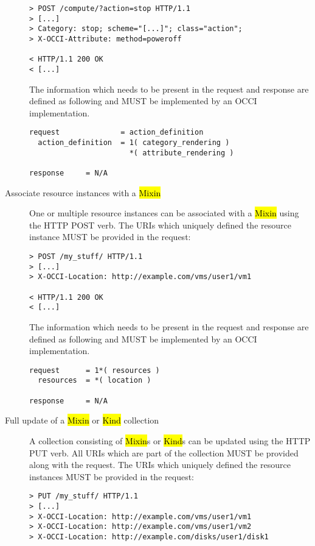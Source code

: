 \documentclass[10pt,a4paper]{article}
\begin{document}
\begin{description}
\begin{verbatim}
> POST /compute/?action=stop HTTP/1.1
> [...]
> Category: stop; scheme="[...]"; class="action";
> X-OCCI-Attribute: method=poweroff

< HTTP/1.1 200 OK
< [...]
\end{verbatim}

    The information which needs to be present in the request and
    response are defined as following and MUST be implemented by an
    OCCI implementation.

\begin{verbatim}
request              = action_definition
  action_definition  = 1( category_rendering )
                       *( attribute_rendering )

response     = N/A
\end{verbatim}

  \item[Associate resource instances with a \hl{Mixin}] One or
    multiple resource instances can be associated with a \hl{Mixin}
    using the HTTP POST verb. The URIs which uniquely defined the
    resource instance MUST be provided in the request:

\begin{verbatim}
> POST /my_stuff/ HTTP/1.1
> [...]
> X-OCCI-Location: http://example.com/vms/user1/vm1

< HTTP/1.1 200 OK
< [...]
\end{verbatim}

    The information which needs to be present in the request and
    response are defined as following and MUST be implemented by an
    OCCI implementation.

\begin{verbatim}
request      = 1*( resources )
  resources  = *( location )

response     = N/A
\end{verbatim}

  \item[Full update of a \hl{Mixin} or \hl{Kind} collection] A
    collection consisting of \hl{Mixin}s or \hl{Kind}s can be updated
    using the HTTP PUT verb. All URIs which are part of the
    collection MUST be provided along with the request. The URIs which
    uniquely defined the resource instances MUST be provided in the
    request:

\begin{verbatim}
> PUT /my_stuff/ HTTP/1.1
> [...]
> X-OCCI-Location: http://example.com/vms/user1/vm1
> X-OCCI-Location: http://example.com/vms/user1/vm2
> X-OCCI-Location: http://example.com/disks/user1/disk1


\end{verbatim}
\end{description}
\end{document}
